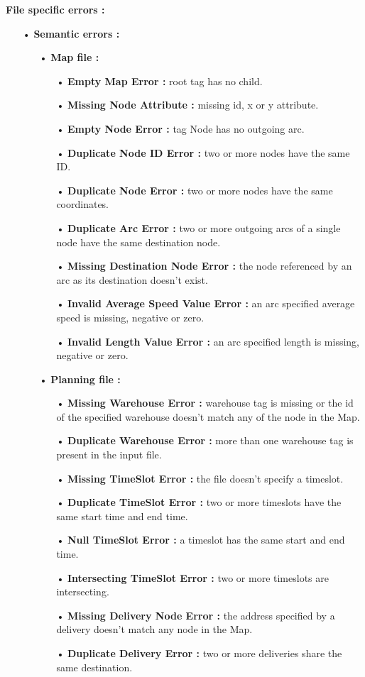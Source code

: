 \documentclass[paper=a4, fontsize=11pt]{report}
\numberwithin{equation}{section}		%
\numberwithin{figure}{section}		%
\numberwithin{table}{section}		%
\begin{document}
\textbf{File specific errors :}
\begin{itemize}
  \item[•] \textbf{Semantic errors :}
  \begin{itemize}
    \item[•] \textbf{Map file :}
    \begin{itemize}
      \item[•] \textbf{Empty Map Error :} root tag has no child.
      \item[•] \textbf{Missing Node Attribute :} missing id, x or y attribute.
      \item[•] \textbf{Empty Node Error :} tag Node has no outgoing arc.
      \item[•] \textbf{Duplicate Node ID Error :} two or more nodes have the same ID.
      \item[•] \textbf{Duplicate Node Error :} two or more nodes have the same coordinates.
      \item[•] \textbf{Duplicate Arc Error :} two or more outgoing arcs of a single node have the same destination node. 
      \item[•] \textbf{Missing Destination Node Error :} the node referenced by an arc as its destination doesn’t exist. 
      \item[•] \textbf{Invalid Average Speed Value Error :} an arc specified average speed is missing, negative or zero. 
      \item[•] \textbf{Invalid Length Value Error :} an arc specified length is missing, negative or zero.
    \end{itemize}

    \item[•] \textbf{Planning file :}
    \begin{itemize}
      \item[•] \textbf{Missing Warehouse Error :} warehouse tag is missing or the id of the specified warehouse doesn’t match any of the node in the Map.
      \item[•] \textbf{Duplicate Warehouse Error :} more than one warehouse tag is present in the input file.
      \item[•] \textbf{Missing TimeSlot Error :} the file doesn’t specify a timeslot.
      \item[•] \textbf{Duplicate TimeSlot Error :} two or more timeslots have the same start time and end time.
      \item[•] \textbf{Null TimeSlot Error :} a timeslot has the same start and end time.
      \item[•] \textbf{Intersecting TimeSlot Error :} two or more timeslots are intersecting.
      \item[•] \textbf{Missing Delivery Node Error :} the address specified by a delivery doesn’t match any node in the Map.
      \item[•] \textbf{Duplicate Delivery Error :} two or more deliveries share the same destination. 
    \end{itemize}
  \end{itemize}
\end{itemize}

\end{document}
